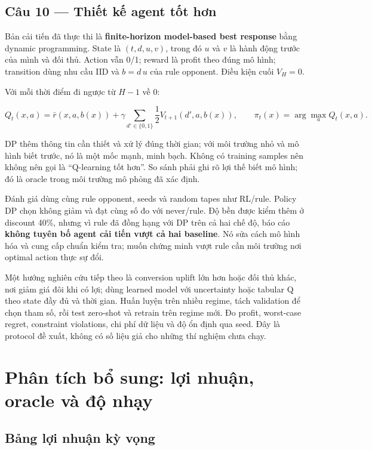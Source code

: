 \subsection{Câu 10 --- Thiết kế agent tốt
hơn}\label{cuxe2u-10-thiux1ebft-kux1ebf-agent-tux1ed1t-hux1a1n}

Bản cải tiến đã thực thi là \textbf{finite-horizon model-based best
response} bằng dynamic programming. State là \((t,d,u,v)\), trong đó
\(u\) và \(v\) là hành động trước của mình và đối thủ. Action vẫn 0/1;
reward là profit theo đúng mô hình; transition dùng nhu cầu IID và
\(b=d\,u\) của rule opponent. Điều kiện cuối \(V_H=0\).

Với mỗi thời điểm đi ngược từ \(H-1\) về 0:

\[Q_t(x,a)=\bar r(x,a,b(x))+\gamma\sum_{d'\in\{0,1\}}\frac12V_{t+1}(d',a,b(x)),\qquad
\pi_t(x)=\arg\max_aQ_t(x,a).\]

DP thêm thông tin cần thiết và xử lý đúng thời gian; với môi trường nhỏ
và mô hình biết trước, nó là một mốc mạnh, minh bạch. Không có training
samples nên không nên gọi là ``Q-learning tốt hơn''. So sánh phải ghi rõ
lợi thế biết mô hình; đó là oracle trong môi trường mô phỏng đã xác
định.

Đánh giá dùng cùng rule opponent, seeds và random tapes như RL/rule.
Policy DP chọn không giảm và đạt cùng số đo với never/rule. Độ bền được
kiểm thêm ở discount 40\%, nhưng vì rule đã đồng hạng với DP trên cả hai
chế độ, báo cáo \textbf{không tuyên bố agent cải tiến vượt cả hai
baseline}. Nó sửa cách mô hình hóa và cung cấp chuẩn kiểm tra; muốn
chứng minh vượt rule cần môi trường nơi optimal action thực sự đổi.

Một hướng nghiên cứu tiếp theo là conversion uplift lớn hơn hoặc đối thủ
khác, nơi giảm giá đôi khi có lợi; dùng learned model với uncertainty
hoặc tabular Q theo state đầy đủ và thời gian. Huấn luyện trên nhiều
regime, tách validation để chọn tham số, rồi test zero-shot và retrain
trên regime mới. Đo profit, worst-case regret, constraint violations,
chi phí dữ liệu và độ ổn định qua seed. Đây là protocol đề xuất, không
có số liệu giả cho những thí nghiệm chưa chạy.

\section{Phân tích bổ sung: lợi nhuận, oracle và độ
nhạy}\label{phuxe2n-tuxedch-bux1ed5-sung-lux1ee3i-nhuux1eadn-oracle-vuxe0-ux111ux1ed9-nhux1ea1y}

\subsection{Bảng lợi nhuận kỳ
vọng}\label{bux1ea3ng-lux1ee3i-nhuux1eadn-kux1ef3-vux1ecdng}

